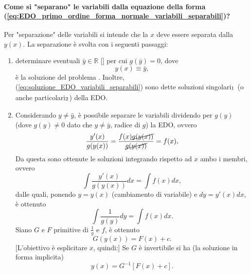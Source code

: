 \paragraph{Come si "separano" le variabili dalla equazione della forma (\ref{eq:EDO_primo_ordine_forma_normale_variabili_separabili})?} Per "separazione" delle variabili si intende che la $x$ deve essere separata dalla $y(x)$. La separazione è svolta con i seguenti passaggi:
\begin{enumerate}
    \item determinare eventuali $\bar y\in\mathbb R$ [\footnotemark] per cui $g(\bar y)=0$, dove
    \begin{equation}\label{eq:soluzione_EDO_variabili_separabili}
        y(x)\equiv \bar y,
    \end{equation}
    è la soluzione del problema \footnotemark. Inoltre, (\ref{eq:soluzione_EDO_variabili_separabili}) sono dette soluzioni singolari$_{\footnotemark}$ (o anche particolari$_{\footnotemark}$) della EDO.
    \item Considerando $y\neq\bar y$, è possibile separare le variabili dividendo per $g(y)$ (dove $g(y)\neq 0$ dato che $y\neq \bar y$, radice di $g$) la EDO, ovvero
    \begin{equation*}
        \frac{y'(x)}{g(y(x))} = \frac{f(x) \cancel{g(y(x))}}{\cancel{g(y(x))}} = f(x),
    \end{equation*}
    Da questa sono ottenute le soluzioni integrando rispetto ad $x$ ambo i membri, ovvero
    \begin{equation*}
        \int\frac{y'(x)}{g(y(x))}dx=\int f(x)dx,
    \end{equation*}
    dalle quali, ponendo $y=y(x)$ (cambiamento di variabile) e $dy = y'(x)dx$, è ottenuto
    \begin{equation*}
        \int \frac{1}{g(y)}dy = \int f(x)dx.
    \end{equation*}
    Siano $G$ e $F$ primitive di $\frac{1}{g}$ e $f$, è ottenuto
    \begin{equation*}
        G(y(x)) = F(x) + c.
    \end{equation*}
    [L'obiettivo è esplicitare $x$, quindi:] Se $G$ è invertibile si ha (la soluzione in forma implicita)
    \begin{equation*}
        y(x) = G^{-1} [F(x) + c].
    \end{equation*}
\end{enumerate}

\addtocounter{footnote}{-3}


